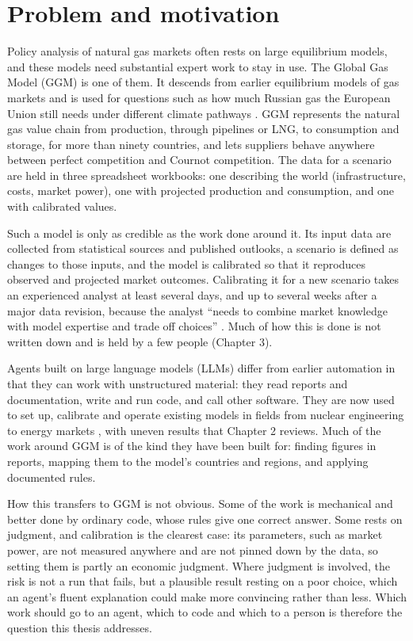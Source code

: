 \section{Problem and motivation}

Policy analysis of natural gas markets often rests on large equilibrium models, and these models need substantial expert work to stay in use.
The Global Gas Model (GGM) \citep{egging2019global} is one of them.
It descends from earlier equilibrium models of gas markets \citep{egging2010world} and is used for questions such as how much Russian gas the European Union still needs under different climate pathways \citep{barner2025russian}.
GGM represents the natural gas value chain from production, through pipelines or LNG, to consumption and storage, for more than ninety countries, and lets suppliers behave anywhere between perfect competition and Cournot competition.
The data for a scenario are held in three spreadsheet workbooks: one describing the world (infrastructure, costs, market power), one with projected production and consumption, and one with calibrated values.

Such a model is only as credible as the work done around it.
Its input data are collected from statistical sources and published outlooks, a scenario is defined as changes to those inputs, and the model is calibrated so that it reproduces observed and projected market outcomes.
Calibrating it for a new scenario takes an experienced analyst at least several days, and up to several weeks after a major data revision, because the analyst ``needs to combine market knowledge with model expertise and trade off choices'' \citep[p.~26]{egging2019global}.
Much of how this is done is not written down and is held by a few people (Chapter 3).

Agents built on large language models (LLMs) differ from earlier automation in that they can work with unstructured material: they read reports and documentation, write and run code, and call other software.
They are now used to set up, calibrate and operate existing models in fields from nuclear engineering to energy markets \citep{abulawi2026autosam, gomezguillen2026agentic, golden2026agentic}, with uneven results that Chapter 2 reviews.
Much of the work around GGM is of the kind they have been built for: finding figures in reports, mapping them to the model's countries and regions, and applying documented rules.

How this transfers to GGM is not obvious.
Some of the work is mechanical and better done by ordinary code, whose rules give one correct answer.
Some rests on judgment, and calibration is the clearest case: its parameters, such as market power, are not measured anywhere and are not pinned down by the data, so setting them is partly an economic judgment.
Where judgment is involved, the risk is not a run that fails, but a plausible result resting on a poor choice, which an agent's fluent explanation could make more convincing rather than less.
Which work should go to an agent, which to code and which to a person is therefore the question this thesis addresses.
